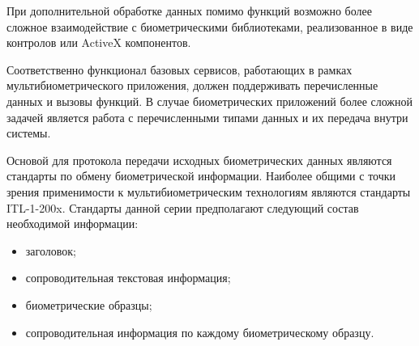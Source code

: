 \begin{multicols}{2}
  При дополнительной обработке данных помимо функций возможно более 
сложное взаимодействие с биометрическими библиотеками, реализованное в 
виде контролов или ActiveX компонентов.
  
  Соответственно функционал базовых сервисов, работающих в рамках 
мультибиометрического приложения, должен поддерживать перечисленные %
{} данных и вызовы функций. В случае биометрических приложений более 
сложной задачей является работа с перечисленными типами данных и их 
передача внутри системы. 
  
  Основой для протокола передачи исходных биометрических данных 
являются стандарты по обмену биометрической информации. Наиболее 
общими с точки зрения применимости к мультибиометрическим технологиям 
являются стандарты ITL-1-200x. Стандарты данной серии предполагают 
следующий состав необходимой информации:
  \begin{itemize}
\item заголовок;
\item сопроводительная текстовая информация;
\item биометрические образцы;
\item сопроводительная информация по каждому биометрическому 
образцу.
\end{itemize}

  \begin{table*}\small
  \begin{center}
  \vspace*{2ex}
  

\end{center}
\end{table*}
\end{multicols}
